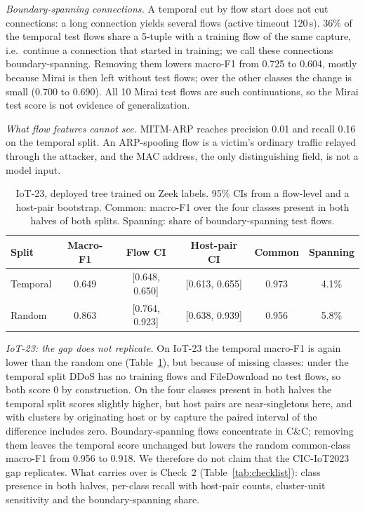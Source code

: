 \emph{Boundary-spanning connections.} A temporal cut by flow start does not cut connections: a long connection yields several flows (active timeout 120\,s). 36\% of the temporal test flows share a 5-tuple with a training flow of the same capture, i.e.\ continue a connection that started in training; we call these connections boundary-spanning. Removing them lowers macro-F1 from 0.725 to 0.604, mostly because Mirai is then left without test flows; over the other classes the change is small (0.700 to 0.690). All 10 Mirai test flows are such continuations, so the Mirai test score is not evidence of generalization.

\emph{What flow features cannot see.} MITM-ARP reaches precision 0.01 and recall 0.16 on the temporal split. An ARP-spoofing flow is a victim's ordinary traffic relayed through the attacker, and the MAC address, the only distinguishing field, is not a model input.

\begin{table}[t]
\centering
\caption{IoT-23, deployed tree trained on Zeek labels. 95\% CIs from a flow-level and a host-pair bootstrap. Common: macro-F1 over the four classes present in both halves of both splits. Spanning: share of boundary-spanning test flows.}
\label{tab:iot23split}
\footnotesize
\setlength{\tabcolsep}{2.5pt}
\begin{tabular}{lccccc}
\hline
Split & Macro-F1 & Flow CI & Host-pair CI & Common & Spanning \\
\hline
Temporal & 0.649 & [0.648, 0.650] & [0.613, 0.655] & 0.973 & 4.1\% \\
Random   & 0.863 & [0.764, 0.923] & [0.638, 0.939] & 0.956 & 5.8\% \\
\hline
\end{tabular}
\end{table}

\emph{IoT-23: the gap does not replicate.} On IoT-23 the temporal macro-F1 is again lower than the random one (Table~\ref{tab:iot23split}), but because of missing classes: under the temporal split DDoS has no training flows and FileDownload no test flows, so both score 0 by construction. On the four classes present in both halves the temporal split scores slightly higher, but host pairs are near-singletons here, and with clusters by originating host or by capture the paired interval of the difference includes zero. Boundary-spanning flows concentrate in C\&C; removing them leaves the temporal score unchanged but lowers the random common-class macro-F1 from 0.956 to 0.918. We therefore do not claim that the CIC-IoT2023 gap replicates. What carries over is Check~2 (Table~\ref{tab:checklist}): class presence in both halves, per-class recall with host-pair counts, cluster-unit sensitivity and the boundary-spanning share.
